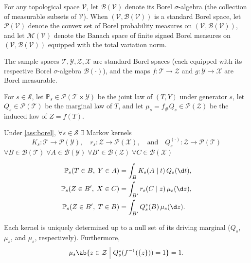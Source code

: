 \documentclass[12pt]{article}
\newcommand{\Prb}{\mathbb{P}}
\newcommand{\Gens}{\mathcal{S}}
\newcommand{\Meas}{\mathcal{P}}
\newcommand{\Sgn}{\mathcal{M}}
\newcommand{\Borel}{\mathcal{B}}
\newcommand{\1}{\mathbbm{1}}
\newcommand{\pushf}[1]{#1_{\#}}
\renewcommand{\[}{\begin{equation}}
\renewcommand{\]}{\end{equation}}
\begin{document}
    For any topological space \(\mathcal{V}\), let \(\Borel(\mathcal{V})\) denote its Borel \(\sigma\)-algebra (the collection of measurable subsets of \(\mathcal{V}\)). When \((\mathcal{V}, \Borel(\mathcal{V}))\) is a standard Borel space, let \(\Meas(\mathcal{V})\) denote the convex set of Borel probability measures on \((\mathcal{V}, \Borel(\mathcal{V}))\), and let \(\Sgn(\mathcal{V})\) denote the Banach space of finite signed Borel measures on \((\mathcal{V}, \Borel(\mathcal{V}))\) equipped with the total variation norm.

    \begin{assumption}
    \label{ass:borel}
        The sample spaces \(\mathcal{T}, \mathcal{Y}, \mathcal{Z}, \mathcal{X}\) are standard Borel spaces (each equipped with its respective Borel \(\sigma\)-algebra \(\Borel(\cdot)\)), and the maps \(f \colon \mathcal{T} \to \mathcal{Z}\) and \(g \colon \mathcal{Y} \to \mathcal{X}\) are Borel measurable.
    \end{assumption}

    For \(s \in \Gens\), let \(\Prb_s \in \Meas(\mathcal{T} \times \mathcal{Y})\) be the joint law of \((T,Y)\) under generator \(s\), let \(Q_s \in \Meas(\mathcal{T})\) be the marginal law of \(T\), and let \(\mu_s = \pushf{f}Q_s \in \Meas(\mathcal{Z})\) be the induced law of \(Z = f(T)\).

    \begin{lemma}
        \noproofref
        \label{lem:disintegration}
        Under \cref{ass:borel},  \(\forall s \in \Gens\;\exists\) Markov kernels
            \begin{equation*}
                K_s : \mathcal{T} \to \Meas(\mathcal{Y}), \quad
                r_s : \mathcal{Z} \to \Meas(\mathcal{X}), \quad \text{and} \quad
                Q_s^{(\cdot)} : \mathcal{Z} \to \Meas(\mathcal{T})
            \end{equation*}
            \(\forall B \in \Borel(\mathcal{T})\; \forall A \in \Borel(\mathcal{Y})\;\forall B' \in \Borel(\mathcal{Z})\;\forall C \in \Borel(\mathcal{X})\)
            
            \begin{align}
                \Prb_s(T \in B,\; Y \in A) &= \int_B K_s(A \mid t)\,Q_s(\d t), \label{eq:full-disint}\\
                \Prb_s(Z \in B',\; X \in C) &= \int_{B'} r_s(C \mid z)\,\mu_s(\d z), \label{eq:induced-disint}\\
                \Prb_s(Z \in B',\; T \in B) &= \int_{B'} Q_s^z(B)\,\mu_s(\d z). \label{eq:truth-disint}
            \end{align}
            
            Each kernel is uniquely determined up to a null set of its driving marginal (\(Q_s\), \(\mu_s\), and \(\mu_s\), respectively).
            Furthermore,
            \[
                \mu_s\ab\{z\in\mathcal Z \;\Big|\; Q_s^z(f^{-1}(\{z\})) = 1\} = 1.
            \]
        \end{lemma}
\end{document}
